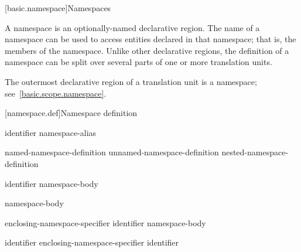 [basic.namespace]{Namespaces}%

\pnum
A namespace is an optionally-named declarative region. The name of a
namespace can be used to access entities declared in that namespace;
that is, the members of the namespace. Unlike other declarative regions,
the definition of a namespace can be split over several parts of one or
more translation units.

\pnum
The outermost declarative region of a translation unit is a namespace;
see~\ref{basic.scope.namespace}.

[namespace.def]{Namespace definition}%
%

\begin{bnf}
\br
        identifier\br
        namespace-alias
\end{bnf}

\begin{bnf}
\br
        named-namespace-definition\br
        unnamed-namespace-definition\br
        nested-namespace-definition
\end{bnf}

\begin{bnf}
\br
           identifier \terminal{\{} namespace-body \terminal{\}}
\end{bnf}

\begin{bnf}
\br
           \terminal{\{} namespace-body \terminal{\}}
\end{bnf}

\begin{bnf}
\br
         enclosing-namespace-specifier \terminal{::} identifier \terminal{\{} namespace-body \terminal{\}}
\end{bnf}

\begin{bnf}
\br
        identifier\br
        enclosing-namespace-specifier \terminal{::} identifier
\end{bnf}

\begin{bnf}
\br
\end{bnf}

